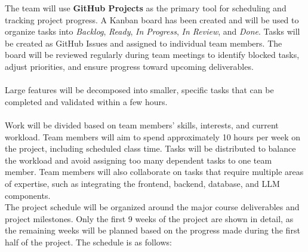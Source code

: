 \documentclass{article}
\begin{document}
The team will use \textbf{GitHub Projects} as the primary tool for scheduling and tracking project progress. A Kanban board has been created and will be used to organize tasks into \textit{Backlog}, \textit{Ready}, \textit{In Progress}, \textit{In Review}, and \textit{Done}. Tasks will be created as GitHub Issues and assigned to individual team members. The board will be reviewed regularly during team meetings to identify blocked tasks, adjust priorities, and ensure progress toward upcoming deliverables.
\\\\
Large features will be decomposed into smaller, specific tasks that can be completed and validated within a few hours. 
\\\\
Work will be divided based on team members' skills, interests, and current workload. Team members will aim to spend approximately 10 hours per week on the project, including scheduled class time. Tasks will be distributed to balance the workload and avoid assigning too many dependent tasks to one team member. Team members will also collaborate on tasks that require multiple areas of expertise, such as integrating the frontend, backend, database, and LLM components.
\\

\noindent The project schedule will be organized around the major course deliverables and project milestones. 
Only the first 9 weeks of the project are shown in detail, as the remaining weeks will be planned based on the progress made during the first half of the project. The schedule is as follows:
\end{document}
